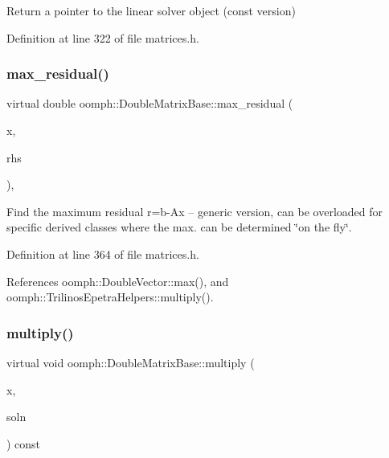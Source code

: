 Return a pointer to the linear solver object (const version) 



Definition at line 322 of file matrices.\+h.

\mbox{\label{classoomph_1_1DoubleMatrixBase_a69a001b704e1d67277170ff7c0e4f6af}} 
\subsubsection{\texorpdfstring{max\+\_\+residual()}{max\_residual()}}
{\footnotesize\ttfamily virtual double oomph\+::\+Double\+Matrix\+Base\+::max\+\_\+residual (\begin{DoxyParamCaption}\item[{const \hyperlink{classoomph_1_1DoubleVector}{Double\+Vector} \&}]{x,  }\item[{const \hyperlink{classoomph_1_1DoubleVector}{Double\+Vector} \&}]{rhs }\end{DoxyParamCaption})\hspace{0.3cm}{\ttfamily [inline]}, {\ttfamily [virtual]}}



Find the maximum residual r=b-\/\+Ax -- generic version, can be overloaded for specific derived classes where the max. can be determined \char`\"{}on the fly\char`\"{}. 



Definition at line 364 of file matrices.\+h.



References oomph\+::\+Double\+Vector\+::max(), and oomph\+::\+Trilinos\+Epetra\+Helpers\+::multiply().

\mbox{\label{classoomph_1_1DoubleMatrixBase_a78204eab557e0dc99618e41a28a5c092}} 
\subsubsection{\texorpdfstring{multiply()}{multiply()}}
{\footnotesize\ttfamily virtual void oomph\+::\+Double\+Matrix\+Base\+::multiply (\begin{DoxyParamCaption}\item[{const \hyperlink{classoomph_1_1DoubleVector}{Double\+Vector} \&}]{x,  }\item[{\hyperlink{classoomph_1_1DoubleVector}{Double\+Vector} \&}]{soln }\end{DoxyParamCaption}) const\hspace{0.3cm}{\ttfamily [pure virtual]}}



